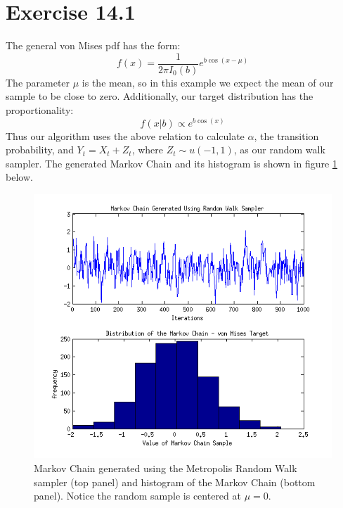\documentclass[12pt,a4paper]{article}
\begin{document}
\section*{Exercise 14.1}
The general von Mises pdf has the form:
\[f(x) = \dfrac{1}{2\pi I_0(b)}e^{b\cos(x-\mu)}\]
The parameter $\mu$ is the mean, so in this example we expect the mean of our sample to be close to zero. Additionally, our target distribution has the proportionality:
\[f(x|b)\propto e^{b\cos(x)}\]
Thus our algorithm uses the above relation to calculate $\alpha$, the transition probability, and $Y_t=X_t+Z_t$, where $Z_t\sim u(-1,1)$, as our random walk sampler. The generated Markov Chain and its histogram is shown in figure \ref{q1fig1} below.

\begin{figure}[ht!] 
\begin{center}
\includegraphics[scale=1]{graph2.png}
\caption{Markov Chain generated using the Metropolis Random Walk sampler (top panel) and histogram of the Markov Chain (bottom panel). Notice the random sample is centered at $\mu=0$.}
\label{q1fig1}
\end{center}
\end{figure}
\FloatBarrier
\end{document}
